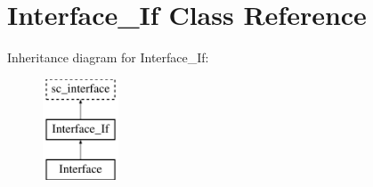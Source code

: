 \hypertarget{classInterface__If}{\section{Interface\-\_\-\-If Class Reference}
\label{classInterface__If}
}
Inheritance diagram for Interface\-\_\-\-If\-:\begin{figure}[H]
\begin{center}
\leavevmode
\includegraphics[height=3.000000cm]{classInterface__If}
\end{center}
\end{figure}
